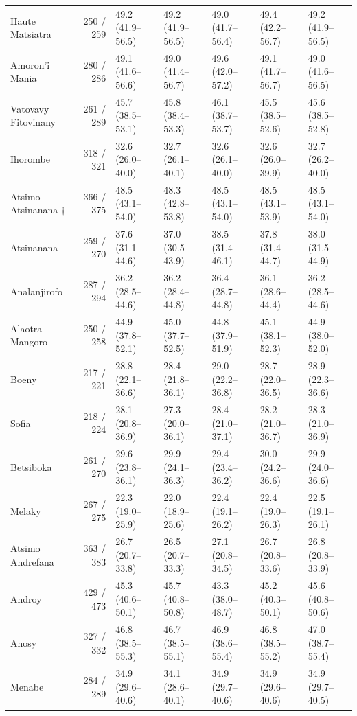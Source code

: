 \documentclass[11pt,a4paper]{article}
\begin{document}
\begin{landscape}
\begin{longtable}{l|rlllll}
Haute Matsiatra & 250 / 259 & 49.2 (41.9–56.5) & 49.2 (41.9–56.5) & 49.0 (41.7–56.4) & 49.4 (42.2–56.7) & 49.2 (41.9–56.5) \\ 
Amoron'i Mania & 280 / 286 & 49.1 (41.6–56.6) & 49.0 (41.4–56.7) & 49.6 (42.0–57.2) & 49.1 (41.7–56.7) & 49.0 (41.6–56.5) \\ 
Vatovavy Fitovinany & 261 / 289 & 45.7 (38.5–53.1) & 45.8 (38.4–53.3) & 46.1 (38.7–53.7) & 45.5 (38.5–52.6) & 45.6 (38.5–52.8) \\ 
Ihorombe & 318 / 321 & 32.6 (26.0–40.0) & 32.7 (26.1–40.1) & 32.6 (26.1–40.0) & 32.6 (26.0–39.9) & 32.7 (26.2–40.0) \\ 
Atsimo Atsinanana $\dagger$ & 366 / 375 & 48.5 (43.1–54.0) & 48.3 (42.8–53.8) & 48.5 (43.1–54.0) & 48.5 (43.1–53.9) & 48.5 (43.1–54.0) \\ 
Atsinanana & 259 / 270 & 37.6 (31.1–44.6) & 37.0 (30.5–43.9) & 38.5 (31.4–46.1) & 37.8 (31.4–44.7) & 38.0 (31.5–44.9) \\ 
Analanjirofo & 287 / 294 & 36.2 (28.5–44.6) & 36.2 (28.4–44.8) & 36.4 (28.7–44.8) & 36.1 (28.6–44.4) & 36.2 (28.5–44.6) \\ 
Alaotra Mangoro & 250 / 258 & 44.9 (37.8–52.1) & 45.0 (37.7–52.5) & 44.8 (37.9–51.9) & 45.1 (38.1–52.3) & 44.9 (38.0–52.0) \\ 
Boeny & 217 / 221 & 28.8 (22.1–36.6) & 28.4 (21.8–36.1) & 29.0 (22.2–36.8) & 28.7 (22.0–36.5) & 28.9 (22.3–36.6) \\ 
Sofia & 218 / 224 & 28.1 (20.8–36.9) & 27.3 (20.0–36.1) & 28.4 (21.0–37.1) & 28.2 (21.0–36.7) & 28.3 (21.0–36.9) \\ 
Betsiboka & 261 / 270 & 29.6 (23.8–36.1) & 29.9 (24.1–36.3) & 29.4 (23.4–36.2) & 30.0 (24.2–36.6) & 29.9 (24.0–36.6) \\ 
Melaky & 267 / 275 & 22.3 (19.0–25.9) & 22.0 (18.9–25.6) & 22.4 (19.1–26.2) & 22.4 (19.0–26.3) & 22.5 (19.1–26.1) \\ 
Atsimo Andrefana & 363 / 383 & 26.7 (20.7–33.8) & 26.5 (20.7–33.3) & 27.1 (20.8–34.5) & 26.7 (20.8–33.6) & 26.8 (20.8–33.9) \\ 
Androy & 429 / 473 & 45.3 (40.6–50.1) & 45.7 (40.8–50.8) & 43.3 (38.0–48.7) & 45.2 (40.3–50.1) & 45.6 (40.8–50.6) \\ 
Anosy & 327 / 332 & 46.8 (38.5–55.3) & 46.7 (38.5–55.1) & 46.9 (38.6–55.4) & 46.8 (38.5–55.2) & 47.0 (38.7–55.4) \\ 
Menabe & 284 / 289 & 34.9 (29.6–40.6) & 34.1 (28.6–40.1) & 34.9 (29.7–40.6) & 34.9 (29.6–40.6) & 34.9 (29.7–40.5) \\ 

\end{longtable}
\end{landscape}
\end{document}
